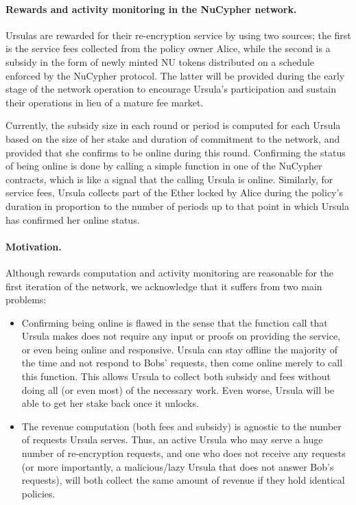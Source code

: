 \paragraph{\bf Rewards and activity monitoring in the NuCypher network.}
Ursulas are rewarded for their re-encryption service by using two sources; the first is the service fees collected from the policy owner Alice, while the second is a subsidy in the form of newly minted NU tokens distributed on a schedule enforced by the NuCypher protocol. The latter will be provided during the early stage of the network operation to encourage Ursula's participation and sustain their operations in lieu of a mature fee market.


Currently, the subsidy size in each round or period is computed for each Ursula based on the size of her stake and duration of commitment to the network, and provided that she confirms to be online during this round. Confirming the status of being online is done by calling a simple function in one of the NuCypher contracts, which is like a signal that the calling Ursula is online. Similarly, for service fees, Ursula collects part of the Ether locked by Alice during the policy's duration in proportion to the number of periods up to that point in which Ursula has confirmed her online status.


\paragraph{\bf Motivation.} Although rewards computation and activity monitoring are reasonable for the first iteration of the network, we acknowledge that it suffers from two main problems:
\begin{itemize}
\setlength{\itemsep}{0pt}
\item Confirming being online is flawed in the sense that the function call that Ursula makes does not require any input or proofs on providing the service, or even being online and responsive. Ursula can stay offline the majority of the time and not respond to Bobs' requests, then come online merely to call this function. This allows Ursula to collect both subsidy and fees without doing all (or even most) of the necessary work. Even worse, Ursula will be able to get her stake back once it unlocks.

\item The revenue computation (both fees and subsidy) is agnostic to the number of requests Ursula serves. Thus, an active Ursula who may serve a huge number of re-encryption requests, and one who does not receive any requests (or more importantly, a malicious/lazy Ursula that does not answer Bob's requests), will both collect the same amount of revenue if they hold identical policies.
\end{itemize}



